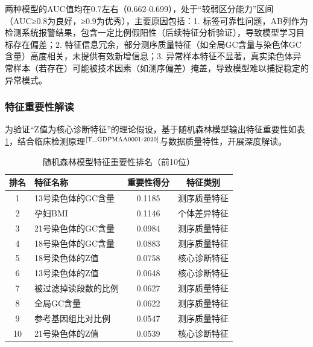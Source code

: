 \documentclass[withoutpreface,bwprint]{cumcmthesis} %
\begin{document}
两种模型的AUC值均在0.7左右（0.662-0.699），处于“较弱区分能力”区间（AUC≥0.8为良好，≥0.9为优秀），主要原因包括：1. 标签可靠性问题，AB列作为检测系统报警结果，包含一定比例假阳性（后续特征分析验证），导致模型学习目标存在偏差；2. 特征信息冗余，部分测序质量特征（如全局GC含量与染色体GC含量）高度相关，未提供有效新增信息；3. 异常样本特征不显著，真实染色体异常样本（若存在）可能被技术因素（如测序偏差）掩盖，导致模型难以捕捉稳定的异常模式。


\subsubsection{特征重要性解读}
为验证“Z值为核心诊断特征”的理论假设，基于随机森林模型输出特征重要性如表\ref{tab:随机森林模型特征排名}，结合临床检测原理$^\text{\cite{T_GDPMAA0001-2020}}$与数据质量特性，开展深度解读。

\begin{table}[H]
    \centering  %
    \caption{随机森林模型特征重要性排名（前10位）}  %
    \label{tab:随机森林模型特征排名}  %
    \begin{threeparttable}
        \begin{tabularx}{0.75\textwidth}{c l c c}
            \toprule[1.5pt]
            \textbf{排名} & \textbf{特征名称} & \textbf{重要性得分} & \textbf{特征类别} \\ 
            \midrule[1pt]
            1    & 13号染色体的GC含量      & 0.1185     & 测序质量特征     \\
            2    & 孕妇BMI                 & 0.1146     & 个体差异特征     \\
            3    & 21号染色体的GC含量      & 0.0984     & 测序质量特征     \\
            4    & 18号染色体的GC含量      & 0.0883     & 测序质量特征     \\
            5    & 18号染色体的Z值         & 0.0758     & 核心诊断特征     \\
            6    & 13号染色体的Z值         & 0.0648     & 核心诊断特征     \\
            7    & 被过滤掉读段数的比例    & 0.0627     & 测序质量特征     \\
            8    & 全局GC含量              & 0.0622     & 测序质量特征     \\
            9    & 参考基因组比对比例      & 0.0547     & 测序质量特征     \\
            10   & 21号染色体的Z值         & 0.0539     & 核心诊断特征     \\

            \bottomrule[1.5pt]
        \end{tabularx}
    \end{threeparttable}
\end{table}
\end{document}
